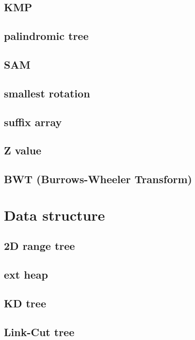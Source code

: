	\subsection{KMP}
		
	\subsection{palindromic tree}
		
	\subsection{SAM}
		
	\subsection{smallest rotation }
		
	\subsection{suffix array}
		
	\subsection{Z value}
		
	\subsection{BWT (Burrows-Wheeler Transform)}
		

\section{Data structure}
	\subsection{2D range tree}
		
	\subsection{ext heap}
		
	\subsection{KD tree}
		
	\subsection{Link-Cut tree}
		
%		
%		
